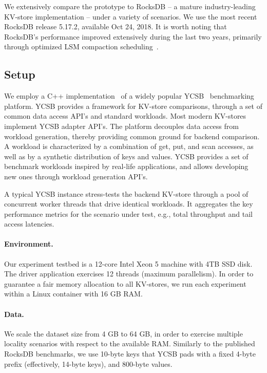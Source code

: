 We extensively compare the \sys\/ prototype to RocksDB -- a mature industry-leading KV-store implementation  -- under a variety of scenarios.  We use the most recent RocksDB release 5.17.2, available Oct 24, 2018.  
It is worth noting that RocksDB's performance improved extensively during the last two years, primarily through 
optimized LSM compaction scheduling~\cite{RocksDBProgress}.   

\subsection{Setup}
We employ a C++ implementation~\cite{Cpp-YCSB} of a widely popular YCSB~\cite{YCSB} benchmarking platform. 
YCSB provides a framework for KV-store comparisons, through a set of common data access API's and standard workloads. 
Most modern KV-stores implement  YCSB adapter API's. The platform decouples data access from workload generation, 
thereby providing common ground for backend comparison. A workload is characterized by a combination of get, put, 
and scan accesses, as well as by a synthetic distribution of keys and values. YCSB provides a set of benchmark workloads
inspired by real-life applications, and allows developing new ones through workload generation API's. 

A typical YCSB instance stress-tests the backend KV-store through a pool of concurrent worker threads that drive identical
workloads. It aggregates the key performance metrics for the scenario under test, e.g., total throughput and tail access latencies. 

\paragraph{Environment.}
Our experiment testbed is a 12-core Intel Xeon 5 machine with 4TB SSD disk. The driver application exercises 12 threads (maximum parallelism). In order to guarantee a fair memory allocation to all KV-stores, we run each experiment 
within a Linux container with 16 GB RAM. 

\paragraph{Data.} We scale the dataset size from 4 GB to 64 GB, in order to exercise multiple locality 
scenarios with respect to the available RAM. Similarly to the published RocksDB benchmarks, we use 
10-byte keys that YCSB pads with a fixed 4-byte prefix (effectively, 14-byte keys), and 800-byte values. 


